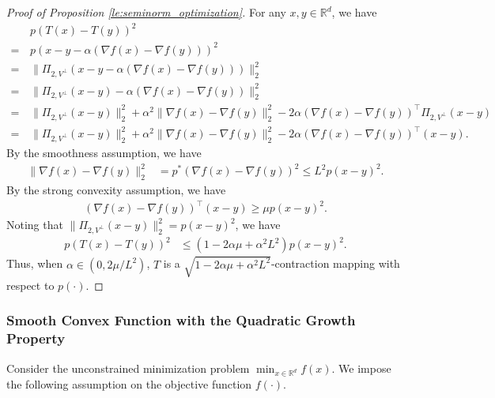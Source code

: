 \documentclass[11 pt]{article}
\begin{document}
	\begin{proof}[Proof of Proposition \ref{le:seminorm_optimization}]
		For any $x, y \in \mathbb{R}^d$, we have
		\begin{align*}
			&p\left(T(x) - T(y) \right)^2 \\
			=\,& p\left(x-y - \alpha \left(\nabla f(x) - \nabla f(y)\right) \right)^2\\
			=\,& \| \Pi_{2,V^\bot}\left(x-y - \alpha \left(\nabla f(x) - \nabla f(y)\right)\right) \|^2_2\\
			=\,& \| \Pi_{2,V^\bot}\left(x-y\right) - \alpha \left(\nabla f(x) - \nabla f(y)\right) \|^2_2\\
			=\,& \| \Pi_{2,V^\bot}\left(x-y\right) \|^2_2 + 
			\alpha^2 \| \nabla f(x) - \nabla f(y)\|^2_2 -2\alpha \left(\nabla f(x) - \nabla f(y)\right)^\top \Pi_{2,V^\bot}\left(x-y\right)\\
			=\,& \| \Pi_{2,V^\bot}\left(x-y\right) \|^2_2 + 
			\alpha^2 \| \nabla f(x) - \nabla f(y)\|^2_2 -2\alpha \left(\nabla f(x) - \nabla f(y)\right)^\top \left(x-y\right).    
		\end{align*}
		By the smoothness assumption, we have 
		\begin{align*}
			\|  \nabla f(x) - \nabla f(y)\|^2_2 &= p^*\left(\nabla f(x) - \nabla f(y) \right)^2 \leq L^2 p\left(x-y \right)^2.
		\end{align*}
		By the strong convexity assumption, we have
		\begin{align*}
			\left(\nabla f(x) - \nabla f(y)\right)^\top \left(x-y\right) \geq \mu p(x-y)^2.
		\end{align*}
		Noting that $ \| \Pi_{2,V^\bot}\left(x-y\right) \|^2_2 = p(x-y)^2$, we have
		\begin{align*}
			p\left(T(x) - T(y) \right)^2 &\leq \left(1 - 2\alpha \mu + \alpha^2 L^2\right) p(x-y)^2.
		\end{align*}
		Thus, when $\alpha \in \left(0, 2\mu/L^2\right)$, $T$ is a $\sqrt{1 - 2\alpha \mu + \alpha^2 L^2}$-contraction mapping with respect to $p(\cdot)$.\end{proof}
	
	
	
	
	\subsubsection{Smooth Convex Function with the Quadratic Growth Property}\label{ap:QG}
	Consider the unconstrained minimization problem $\min_{x \in \mathbb{R}^d} f(x)$. We impose the following assumption on the objective function $f(\cdot)$.
	
\end{document}

